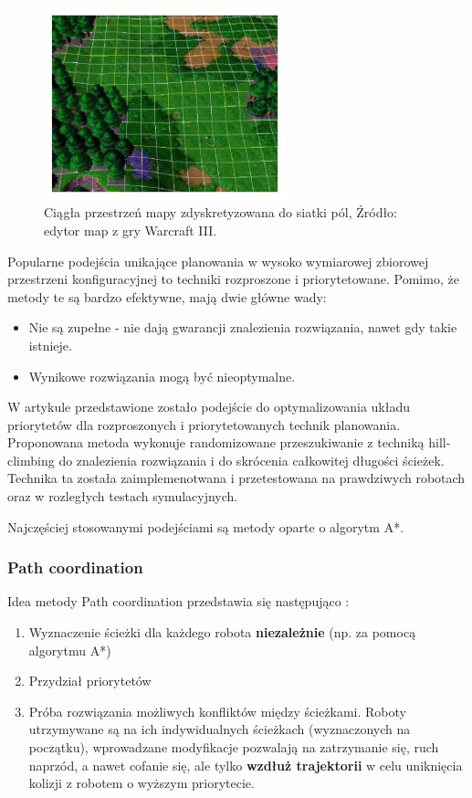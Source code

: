 \begin{figure}[H]
	\centering
	\includegraphics[width=7cm]{img/games/warcraft-map-editor}
	\caption{Ciągła przestrzeń mapy zdyskretyzowana do siatki pól, Źródło: edytor map z gry Warcraft III.}
	\label{fig:img_games_warcraft-map-editor}
\end{figure}

Popularne podejścia unikające planowania w wysoko wymiarowej zbiorowej przestrzeni konfiguracyjnej to techniki rozproszone i priorytetowane.
Pomimo, że metody te są bardzo efektywne, mają dwie główne wady:
\vspace{-1em}
\begin{itemize}[noitemsep]
	\item Nie są zupełne - nie dają gwarancji znalezienia rozwiązania, nawet gdy takie istnieje.
	\item Wynikowe rozwiązania mogą być nieoptymalne.
\end{itemize}

W artykule \cite{optpriorities} przedstawione zostało podejście do optymalizowania układu priorytetów dla rozproszonych i priorytetowanych technik planowania.
Proponowana metoda wykonuje randomizowane przeszukiwanie z techniką hill-climbing do znalezienia rozwiązania i do skrócenia całkowitej długości ścieżek.
Technika ta została zaimplemenotwana i przetestowana na prawdziwych robotach oraz w rozległych testach symulacyjnych.

Najczęściej stosowanymi podejściami są metody oparte o algorytm A*.

\subsubsection{Path coordination}
Idea metody Path coordination przedstawia się następująco \cite{optpriorities}:
\begin{enumerate}
	\item Wyznaczenie ścieżki dla każdego robota {\bf niezależnie} (np. za pomocą algorytmu A*)
	\item Przydział priorytetów
	\item Próba rozwiązania możliwych konfliktów między ścieżkami. Roboty utrzymywane są na ich indywidualnych ścieżkach (wyznaczonych na początku), wprowadzane modyfikacje pozwalają na zatrzymanie się, ruch naprzód, a nawet cofanie się, ale tylko {\bf wzdłuż trajektorii} w celu uniknięcia kolizji z robotem o wyższym priorytecie.
\end{enumerate}

